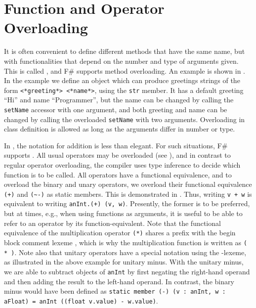\documentclass[fsharpNotes.tex]{subfiles}
\begin{document}
\section{Function and Operator Overloading}
It is often convenient to define different methods that have the same name, but with functionalities that depend on the number and type of arguments given. This is called , and F\# supports method overloading. An example is shown in .
%
% 
In the example we define an object which can produce greetings strings of the form \lstinline[language=syntax]{<*greeting*> <*name*>}, using the \lstinline{str} member. It has a default greeting ``Hi'' and name ``Programmer'', but the name can be changed by calling the \lstinline{setName} accessor with one argument, and both greeting and name can be changed by calling the overloaded \lstinline{setName} with two arguments. Overloading in class definition is allowed as long as the arguments differ in number or type.

In , the notation for addition is less than elegant. For such situations, F\# supports . All usual operators may be overloaded (see ), and in contrast to regular operator overloading, the compiler uses type inference to decide which function is to be called. All operators have a functional equivalence, and to overload the binary \lexeme{+} and unary \lexeme{-} operators, we overload their functional equivalence \lstinline{(+)} and \lstinline{(~-)} as static members. This is demonstrated in .
%
% 
Thus, writing \lstinline{v + w} is equivalent to writing \lstinline{anInt.(+) (v, w)}. Presently, the former is to be preferred, but at times, e.g., when using functions as arguments, it is useful to be able to refer to an operator by its function-equivalent. Note that the functional equivalence of the multiplication operator \lstinline{(*)} shares a  prefix with the begin block comment lexeme \lexeme{(*}, which is why the multiplication function is written as \lstinline{( * )}. Note also that unitary operators have a special notation using the \lexeme{\~}-lexeme, as illustrated in the above example for unitary minus. With the unitary minus, we are able to subtract objects of \lstinline{anInt} by first negating the right-hand operand and then adding the result to the left-hand operand. In contrast, the binary minus would have been defined as \lstinline{static member (-) (v : anInt, w : aFloat) = anInt ((float v.value) - w.value)}.
\end{document}
